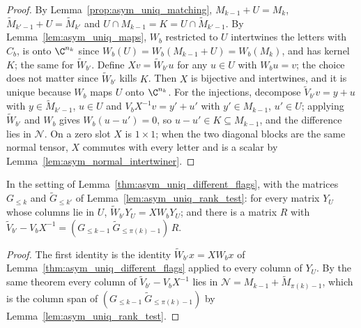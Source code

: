 \begin{proof}
    \leanok
    By Lemma~\ref{prop:asym_uniq_matching}, $M_{k-1}+U=M_k$, $\widetilde M_{k'-1}+U=\widetilde M_{k'}$
    and $U\cap M_{k-1}=K=U\cap\widetilde M_{k'-1}$. By Lemma~\ref{lem:asym_uniq_maps}, $W_b$
    restricted to $U$ intertwines the letters with $C_b$, is onto $\C^{n_k}$ since
    $W_b(U)=W_b(M_{k-1}+U)=W_b(M_k)$, and has kernel $K$; the same for $\widetilde W_{b'}$. Define
    $Xv=\widetilde W_{b'}u$ for any $u\in U$ with $W_bu=v$; the choice does not matter since
    $\widetilde W_{b'}$ kills $K$. Then $X$ is bijective and intertwines, and it is unique because
    $W_b$ maps $U$ onto $\C^{n_k}$. For the injections, decompose $\widetilde V_{b'}v=y+u$ with
    $y\in\widetilde M_{k'-1}$, $u\in U$ and $V_bX^{-1}v=y'+u'$ with $y'\in M_{k-1}$, $u'\in U$; applying
    $\widetilde W_{b'}$ and $W_b$ gives $W_b(u-u')=0$, so $u-u'\in K\subseteq M_{k-1}$, and the
    difference lies in $\mathcal N$. On a zero slot $X$ is $1\times1$; when the two diagonal blocks
    are the same normal tensor, $X$ commutes with every letter and is a scalar by
    Lemma~\ref{lem:asym_normal_intertwiner}.
\end{proof}

\begin{lemma}
    \label{cor:asym_uniq_different_flags_matrices}
    \leanok
    In the setting of Lemma~\ref{thm:asym_uniq_different_flags}, with the matrices $G_{\leq k}$
    and $\widetilde G_{\leq k'}$ of Lemma~\ref{lem:asym_uniq_rank_test}: for every matrix $Y_U$ whose
    columns lie in $U$, $\widetilde W_{b'}Y_U=XW_bY_U$; and there is a matrix $R$ with
    $\widetilde V_{b'}-V_bX^{-1}=(G_{\leq k-1}\ \widetilde G_{\leq\pi(k)-1})\,R$.
\end{lemma}

\begin{proof}
    \leanok
    The first identity is the identity $\widetilde W_{b'}x=XW_bx$ of
    Lemma~\ref{thm:asym_uniq_different_flags} applied to every column of $Y_U$. By the same
    theorem every column of $\widetilde V_{b'}-V_bX^{-1}$ lies in
    $\mathcal N=M_{k-1}+\widetilde M_{\pi(k)-1}$, which is the column span of
    $(G_{\leq k-1}\ \widetilde G_{\leq\pi(k)-1})$ by Lemma~\ref{lem:asym_uniq_rank_test}.
\end{proof}

